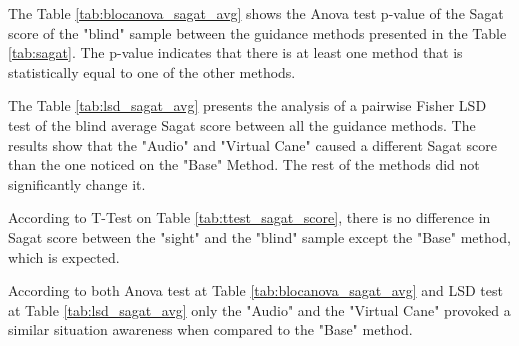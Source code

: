 The Table \ref{tab:blocanova_sagat_avg} shows the Anova test p-value of the Sagat score of the "blind" sample between the guidance methods presented in the Table \ref{tab:sagat}. The p-value indicates that there is at least one method that is statistically equal to one of the other methods.



The Table \ref{tab:lsd_sagat_avg} presents the analysis of a pairwise Fisher LSD test of the blind average Sagat score between all the guidance methods. The results show that the "Audio" and "Virtual Cane" caused a different Sagat score than the one noticed on the "Base" Method. The rest of the methods did not significantly change it.



According to T-Test on Table \ref{tab:ttest_sagat_score}, there is no difference in Sagat score between the "sight" and the "blind" sample except the "Base" method, which is expected.

According to both Anova test at Table \ref{tab:blocanova_sagat_avg} and LSD test at Table \ref{tab:lsd_sagat_avg} only the "Audio"  and the "Virtual Cane" provoked a similar situation awareness when compared to the "Base" method.

\FloatBarrier